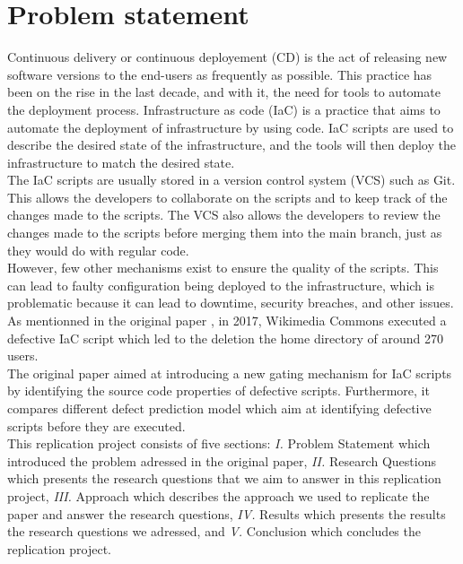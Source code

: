 
\section{Problem statement}
Continuous delivery or continuous deployement (CD) is the act of releasing new software versions to the end-users as frequently as possible. This practice has been on the rise in the last decade, and with it, the need for tools to automate the deployment process. Infrastructure as code (IaC) is a practice that aims to automate the deployment of infrastructure by using code. IaC scripts are used to describe the desired state of the infrastructure, and the tools will then deploy the infrastructure to match the desired state. \\
The IaC scripts are usually stored in a version control system (VCS) such as Git. This allows the developers to collaborate on the scripts and to keep track of the changes made to the scripts. The VCS also allows the developers to review the changes made to the scripts before merging them into the main branch, just as they would do with regular code. \\
However, few other mechanisms exist to ensure the quality of the scripts. This can lead to faulty configuration being deployed to the infrastructure, which is problematic because it can lead to downtime, security breaches, and other issues. As mentionned in the original paper \cite{b1}, in 2017, Wikimedia Commons executed a defective IaC script which led to the deletion the home directory of around 270 users. \\
The original paper aimed at introducing a new gating mechanism for IaC scripts by identifying the source code properties of defective scripts. Furthermore, it compares different defect prediction model which aim at identifying defective scripts before they are executed. \\
This replication project consists of five sections: \textit{I.} Problem Statement which introduced the problem adressed in the original paper, \textit{II.} Research Questions which presents the research questions that we aim to answer in this replication project, \textit{III.} Approach which describes the approach we used to replicate the paper and answer the research questions, \textit{IV.} Results which presents the results the research questions we adressed, and \textit{V.} Conclusion which concludes the replication project.


